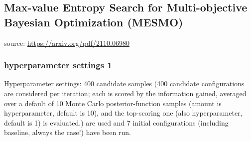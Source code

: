\documentclass[11pt]{article}
\begin{document}
\subsection{Max-value Entropy Search for Multi-objective Bayesian Optimization (MESMO)}
source: \url{https://arxiv.org/pdf/2110.06980}
\subsubsection{hyperparameter settings 1}
Hyperparameter settings: 400 candidate samples (400 candidate configurations are considered per iteration; each is scored by the information gained, averaged over a default of 10 Monte Carlo posterior-function samples (amount is hyperparameter, default is 10), and the top-scoring one (also hyperparameter, default is 1) is evaluated.) are used and 7 initial configurations (including baseline, always the case!) have been run.
\end{document}
